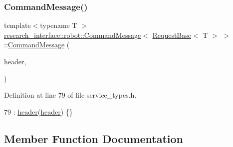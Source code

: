 \subsubsection{\texorpdfstring{Command\+Message()}{CommandMessage()}\hspace{0.1cm}{\footnotesize\ttfamily [2/2]}}
{\footnotesize\ttfamily template$<$typename T $>$ \\
\hyperlink{structresearch__interface_1_1robot_1_1CommandMessage}{research\+\_\+interface\+::robot\+::\+Command\+Message}$<$ \hyperlink{structresearch__interface_1_1robot_1_1RequestBase}{Request\+Base}$<$ T $>$ $>$\+::\hyperlink{structresearch__interface_1_1robot_1_1CommandMessage}{Command\+Message} (\begin{DoxyParamCaption}\item[{const \hyperlink{structresearch__interface_1_1robot_1_1CommandHeader}{Command\+Header} \&}]{header,  }\item[{const \hyperlink{structresearch__interface_1_1robot_1_1RequestBase}{Request\+Base}$<$ T $>$ \&}]{ }\end{DoxyParamCaption})\hspace{0.3cm}{\ttfamily [inline]}}



Definition at line 79 of file service\+\_\+types.\+h.


\begin{DoxyCode}
79 : \hyperlink{structresearch__interface_1_1robot_1_1CommandMessage_3_01RequestBase_3_01T_01_4_01_4_a67abaf5eb91f48562dadd45a760d0083}{header}(\hyperlink{structresearch__interface_1_1robot_1_1CommandMessage_3_01RequestBase_3_01T_01_4_01_4_a67abaf5eb91f48562dadd45a760d0083}{header}) \{\}
\end{DoxyCode}


\subsection{Member Function Documentation}
\mbox{\label{structresearch__interface_1_1robot_1_1CommandMessage_3_01RequestBase_3_01T_01_4_01_4_aa2e659e0b90f470edc5bbcba02663c07}} 
